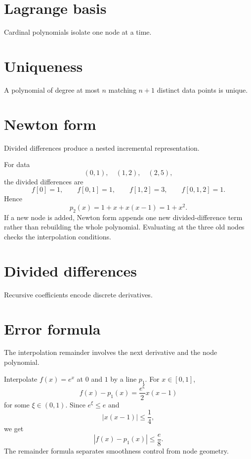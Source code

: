 \section{Lagrange basis}
Cardinal polynomials isolate one node at a time.

\section{Uniqueness}
A polynomial of degree at most $n$ matching $n+1$ distinct data points is unique.

\section{Newton form}
Divided differences produce a nested incremental representation.


\begin{example}\label{ex:ii20-expand-01}
For data
\[
(0,1),\quad(1,2),\quad(2,5),
\]
the divided differences are
\[
f[0]=1,\qquad f[0,1]=1,\qquad f[1,2]=3,\qquad
f[0,1,2]=1.
\]
Hence
\[
p_2(x)=1+x+x(x-1)=1+x^2.
\]
If a new node is added, Newton form appends one new divided-difference term
rather than rebuilding the whole polynomial. Evaluating at the three old nodes
checks the interpolation conditions.
\end{example}
\section{Divided differences}
Recursive coefficients encode discrete derivatives.

\section{Error formula}
The interpolation remainder involves the next derivative and the node polynomial.


\begin{example}\label{ex:ii20-expand-02}
Interpolate \(f(x)=e^x\) at \(0\) and \(1\) by a line \(p_1\). For
\(x\in[0,1]\),
\[
f(x)-p_1(x)=\frac{e^\xi}{2}x(x-1)
\]
for some \(\xi\in(0,1)\). Since \(e^\xi\le e\) and
\[
|x(x-1)|\le\frac14,
\]
we get
\[
|f(x)-p_1(x)|\le\frac{e}{8}.
\]
The remainder formula separates smoothness control from node geometry.
\end{example}
